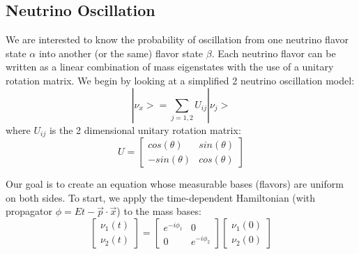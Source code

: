 \documentclass[12pt]{article}
\begin{document}
\subsection{Neutrino Oscillation}
\par We are interested to know the probability of oscillation from one neutrino flavor state $\alpha$ into another (or the same) flavor state $\beta$. Each neutrino flavor can be written as a linear combination of mass eigenstates with the use of a unitary rotation matrix. We begin by looking at a simplified 2 neutrino oscillation model:
\begin{equation} \label{eq:eig}
|\nu_x> = \sum_{j=1,2} U_{ij} |\nu_j>  
\end{equation}
where $U_{ij}$ is the 2 dimensional unitary rotation matrix: 
\begin{equation}
U = \begin{bmatrix}
cos(\theta) & sin(\theta)
\\ -sin(\theta)& cos(\theta)
\end{bmatrix}
\end{equation}

\noindent Our goal is to create an equation whose measurable bases (flavors) are uniform on both sides. To start, we apply the time-dependent Hamiltonian (with propagator $\phi = Et - \vec{p}\cdot\vec{x}$) to the mass bases: 
\begin{equation} \label{eq:prop}
 \begin{bmatrix}
 \nu_1(t)
 \\ \nu_2(t)
 \end{bmatrix}
 = \begin{bmatrix}
e^{-i\phi_1} & 0
\\ 0 & e^{-i\phi_2}
\end{bmatrix} 
 \begin{bmatrix}
 \nu_1(0)
 \\ \nu_2(0)
 \end{bmatrix}
\end{equation}
\end{document}
